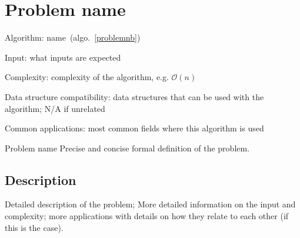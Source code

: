 \documentclass{article}
\begin{document}
\fi

%
%

\def\pbname{Problem name} %

\section{\pbname} 

\begin{overview}
\item [Algorithm:] name~(algo.~\ref{problemnb}) 
\item [Input:] what inputs are expected
\item [Complexity:] complexity of the algorithm, e.g. $\mathcal{O}(n)$
\item [Data structure compatibility:] data structures that can be used with the algorithm; N/A if unrelated
\item [Common applications:] most common fields where this algorithm is used
\end{overview}



\begin{problem}{\pbname}
Precise and concise formal definition of the problem.
\end{problem}

\subsection*{Description}
Detailed description of the problem; More detailed information on the input and complexity; more applications with details on how they relate to each other (if this is the case).

\begin{Algorithm}[name\label{problemnb}]
	\Input{}
	\Output{}
\BlankLine

\Ret
 
\end{Algorithm}
\end{document}
